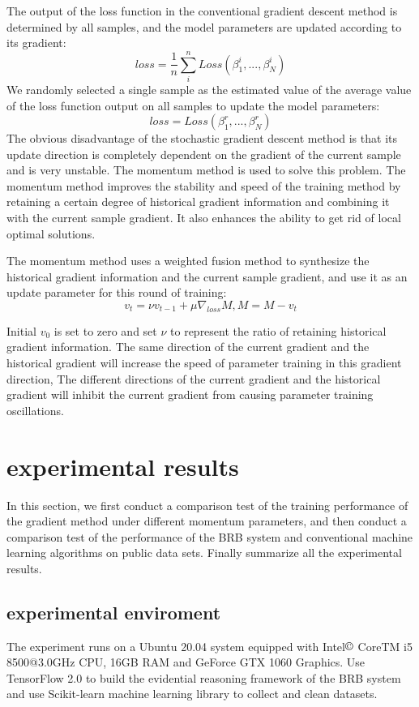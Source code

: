 \documentclass{ieeeaccess}
\begin{document}
The output of the loss function in the conventional gradient descent method is determined by all samples,
and the model parameters are updated according to its gradient:
\begin{equation}
    loss=\frac{1}{n}\sum_i^nLoss(\beta_1^i,...,\beta_N^i)
\end{equation}
We randomly selected a single sample as the estimated value of the average value of the loss function output on all samples to update the model parameters:
\begin{equation}
    loss=Loss(\beta_1^r,...,\beta_N^r)
\end{equation}
The obvious disadvantage of the stochastic gradient descent method is that its update direction is completely dependent on the gradient of the current sample and is very unstable. The momentum method is used to solve this problem.
The momentum method improves the stability and speed of the training method by retaining a certain degree of historical gradient information and combining it with the current sample gradient.
It also enhances the ability to get rid of local optimal solutions.

The momentum method uses a weighted fusion method to synthesize the historical gradient information and the current sample gradient,
and use it as an update parameter for this round of training:
\begin{equation}
    v_t=\nu v_{t-1}+\mu\nabla_{loss}M,M=M-v_t
\end{equation}

Initial $v_0$ is set to zero and set $\nu$ to represent the ratio of retaining historical gradient information.
The same direction of the current gradient and the historical gradient will increase the speed of parameter training in this gradient direction,
The different directions of the current gradient and the historical gradient will inhibit the current gradient from causing parameter training oscillations.

\section{experimental results}
In this section, we first conduct a comparison test of the training performance of the gradient method under different momentum parameters,
and then conduct a comparison test of the performance of the BRB system and conventional machine learning algorithms on public data sets.
Finally summarize all the experimental results.

\subsection{experimental enviroment}
The experiment runs on a Ubuntu 20.04 system equipped with Intel$\copyright$ Core$\text{TM}$ i5 8500@3.0GHz CPU, 16GB RAM and GeForce GTX 1060 Graphics.
Use TensorFlow 2.0 to build the evidential reasoning framework of the BRB system and use Scikit-learn machine learning library to collect and clean datasets.
\end{document}
